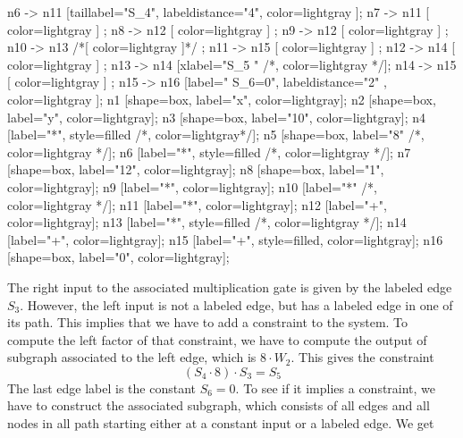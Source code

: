 \begin{example}
\begin{center}
{	n6 -> n11 [taillabel="S_4", labeldistance="4", color=lightgray ];
	n7 -> n11 [ color=lightgray ] ;
	n8 -> n12 [ color=lightgray ] ;
	n9 -> n12 [ color=lightgray ] ;
	n10 -> n13 /*[ color=lightgray ]*/ ; 
	n11 -> n15 [ color=lightgray ] ;
	n12 -> n14 [ color=lightgray ] ;	
	n13 -> n14 [xlabel="S_5  "  /*, color=lightgray */];
	n14 -> n15 [ color=lightgray ] ;
	n15 -> n16 [label="  S_6=0", labeldistance="2" , color=lightgray ];
	n1 [shape=box, label="x", color=lightgray];
	n2 [shape=box, label="y", color=lightgray];
	n3 [shape=box, label="10", color=lightgray];
	n4 [label="*", style=filled /*, color=lightgray*/];
	n5 [shape=box, label="8" /*, color=lightgray */];
	n6 [label="*", style=filled /*, color=lightgray */];
	n7 [shape=box, label="12", color=lightgray];
	n8 [shape=box, label="1", color=lightgray];
	n9 [label="*", color=lightgray];
	n10 [label="*" /*, color=lightgray */];
	n11 [label="*", color=lightgray];	
	n12 [label="+", color=lightgray];	
	n13 [label="*", style=filled /*, color=lightgray */];
	n14 [label="+", color=lightgray];
	n15 [label="+", style=filled, color=lightgray];
	n16 [shape=box, label="0", color=lightgray];		
}
\end{center}
The right input to the associated multiplication gate is given by the labeled edge $S_3$. However,  the left input is not a labeled edge, but has a labeled edge in one of its path. This implies that we have to add a constraint to the system. To compute the left factor of that constraint, we have to compute the output of subgraph associated to the left edge, which is $8\cdot W_2$. This gives the constraint
$$
(S_4 \cdot 8) \cdot S_3 = S_5
$$ 
The last edge label is the constant $S_6=0$. To see if it implies a constraint, we have to construct the associated subgraph, which consists of all edges and all nodes in all path starting either at a constant input or a labeled edge. We get
\begin{center}
\end{center}
\end{example}
